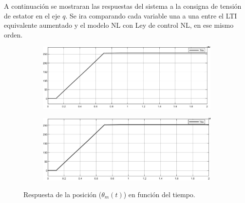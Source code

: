 \documentclass{article}
\begin{document}
A continuación se mostraran las respuestas del sistema a la consigna de tensión de estator en el eje $q$.
Se ira comparando cada variable una a una entre el LTI equivalente aumentado y el modelo NL con Ley de control NL, 
en ese mismo orden.

\begin{figure}[H]
    \centering
    \begin{subfigure}[b]{0.8\textwidth}
        \includegraphics[width=\textwidth]{5.1.6_tita.jpg}
    \end{subfigure}
    \begin{subfigure}[b]{0.8\textwidth}
        \includegraphics[width=1\textwidth]{5.1.6_tita_NL.jpg}
    \end{subfigure}
    \caption{Respuesta de la posición ($\theta_m(t)$) en función del tiempo.}
    \label{fig:posicion}
\end{figure}
\end{document}
